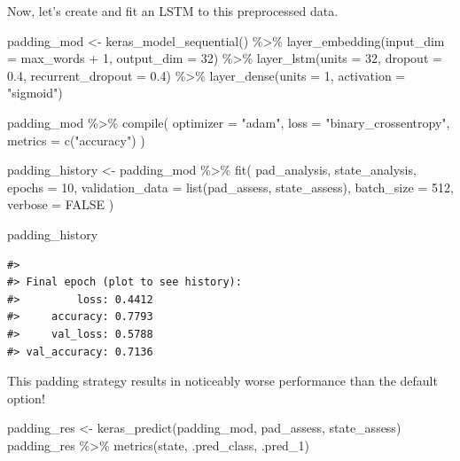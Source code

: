 \documentclass[
]{krantz}
\makeatletter
\newenvironment{Shaded}{\begin{snugshade}}{\end{snugshade}}
\newcommand{\AttributeTok}[1]{\textcolor[rgb]{0.77,0.63,0.00}{#1}}
\newcommand{\ConstantTok}[1]{\textcolor[rgb]{0.00,0.00,0.00}{#1}}
\newcommand{\DecValTok}[1]{\textcolor[rgb]{0.00,0.00,0.81}{#1}}
\newcommand{\FloatTok}[1]{\textcolor[rgb]{0.00,0.00,0.81}{#1}}
\newcommand{\FunctionTok}[1]{\textcolor[rgb]{0.00,0.00,0.00}{#1}}
\newcommand{\NormalTok}[1]{#1}
\newcommand{\OtherTok}[1]{\textcolor[rgb]{0.56,0.35,0.01}{#1}}
\newcommand{\SpecialCharTok}[1]{\textcolor[rgb]{0.00,0.00,0.00}{#1}}
\newcommand{\StringTok}[1]{\textcolor[rgb]{0.31,0.60,0.02}{#1}}
\newenvironment{kframe}{%
\medskip{}
\setlength{\fboxsep}{.8em}
 \def\at@end@of@kframe{}%
 \ifinner\ifhmode%
  \def\at@end@of@kframe{\end{minipage}}%
  \begin{minipage}{\columnwidth}%
 \fi\fi%
 \def\FrameCommand##1{\hskip\@totalleftmargin \hskip-\fboxsep
 \colorbox{shadecolor}{##1}\hskip-\fboxsep
     \hskip-\linewidth \hskip-\@totalleftmargin \hskip\columnwidth}%
 \MakeFramed {\advance\hsize-\width
   \@totalleftmargin\z@ \linewidth\hsize
   \@setminipage}}%
 {\par\unskip\endMakeFramed%
 \at@end@of@kframe}
\renewenvironment{Shaded}{\begin{kframe}}{\end{kframe}}
\makeatother
\begin{document}
Now, let's create and fit an LSTM to this preprocessed data.

\begin{Shaded}
\begin{Highlighting}[]
\NormalTok{padding\_mod }\OtherTok{\textless{}{-}} \FunctionTok{keras\_model\_sequential}\NormalTok{() }\SpecialCharTok{\%\textgreater{}\%}
  \FunctionTok{layer\_embedding}\NormalTok{(}\AttributeTok{input\_dim =}\NormalTok{ max\_words }\SpecialCharTok{+} \DecValTok{1}\NormalTok{, }\AttributeTok{output\_dim =} \DecValTok{32}\NormalTok{) }\SpecialCharTok{\%\textgreater{}\%}
  \FunctionTok{layer\_lstm}\NormalTok{(}\AttributeTok{units =} \DecValTok{32}\NormalTok{, }\AttributeTok{dropout =} \FloatTok{0.4}\NormalTok{, }\AttributeTok{recurrent\_dropout =} \FloatTok{0.4}\NormalTok{) }\SpecialCharTok{\%\textgreater{}\%}
  \FunctionTok{layer\_dense}\NormalTok{(}\AttributeTok{units =} \DecValTok{1}\NormalTok{, }\AttributeTok{activation =} \StringTok{"sigmoid"}\NormalTok{)}

\NormalTok{padding\_mod }\SpecialCharTok{\%\textgreater{}\%}
  \FunctionTok{compile}\NormalTok{(}
    \AttributeTok{optimizer =} \StringTok{"adam"}\NormalTok{,}
    \AttributeTok{loss =} \StringTok{"binary\_crossentropy"}\NormalTok{,}
    \AttributeTok{metrics =} \FunctionTok{c}\NormalTok{(}\StringTok{"accuracy"}\NormalTok{)}
\NormalTok{  )}

\NormalTok{padding\_history }\OtherTok{\textless{}{-}}\NormalTok{ padding\_mod }\SpecialCharTok{\%\textgreater{}\%}
  \FunctionTok{fit}\NormalTok{(}
\NormalTok{    pad\_analysis,}
\NormalTok{    state\_analysis,}
    \AttributeTok{epochs =} \DecValTok{10}\NormalTok{,}
    \AttributeTok{validation\_data =} \FunctionTok{list}\NormalTok{(pad\_assess, state\_assess),}
    \AttributeTok{batch\_size =} \DecValTok{512}\NormalTok{,}
    \AttributeTok{verbose =} \ConstantTok{FALSE}
\NormalTok{  )}

\NormalTok{padding\_history}
\end{Highlighting}
\end{Shaded}

\begin{verbatim}
#> 
#> Final epoch (plot to see history):
#>         loss: 0.4412
#>     accuracy: 0.7793
#>     val_loss: 0.5788
#> val_accuracy: 0.7136
\end{verbatim}

This padding strategy results in noticeably worse performance than the default option!

\begin{Shaded}
\begin{Highlighting}[]
\NormalTok{padding\_res }\OtherTok{\textless{}{-}} \FunctionTok{keras\_predict}\NormalTok{(padding\_mod, pad\_assess, state\_assess)}
\NormalTok{padding\_res }\SpecialCharTok{\%\textgreater{}\%} \FunctionTok{metrics}\NormalTok{(state, .pred\_class, .pred\_1)}
\end{Highlighting}
\end{Shaded}
\end{document}
